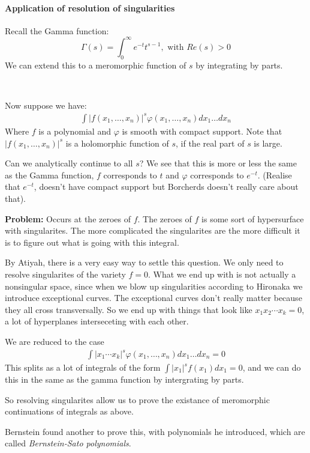 \paragraph*{Application of resolution of singularities}
Recall the Gamma function:\[\Gamma(s) = \int_0^\infty e^{-t}t^{s-1}, \text{ with }Re(s)>0\]
We can extend this to a meromorphic function of $s$ by integrating by parts.

\

Now suppose we have:\begin{align*}
    \int |f(x_1,\ldots,x_n)|^s\varphi(x_1,\ldots,x_n)dx_1\ldots dx_n
\end{align*} 
Where $f$ is a polynomial and $\varphi$ is smooth with compact support. Note that $|f(x_1,\ldots,x_n)|^s$ is a holomorphic function of $s$, if the real part of $s$ is large.

Can we analytically continue to all $s$? We see that this is more or less the same as the Gamma function, $f$ corresponds to $t$ and $\varphi$ corresponds to $e^{-t}$. (Realise that $e^{-t}$, doesn't have compact support but Borcherds doesn't really care about that).

\textbf{Problem:} Occurs at the zeroes of $f$. The zeroes of $f$ is some sort of hypersurface with singularites. The more complicated the singularites are the more difficult it is to figure out what is going with this integral.

By Atiyah, there is a very easy way to settle this question. We only need to resolve singularites of the variety $f=0$. What we end up with is not actually a nonsingular space, since when we blow up singularities according to Hironaka we introduce exceptional curves. The exceptional curves don't really matter because they all cross transversally. 
So we end up with things that look like $x_1x_2\cdots x_k =0$, a lot of hyperplanes interseceting with each other.

We are reduced to the case\begin{align*}
    \int |x_1\cdots x_k|^s\varphi(x_1,\ldots,x_n)dx_1\ldots dx_n = 0
\end{align*}  
This splits as a lot of integrals of the form $\int |x_1|^s f(x_1)dx_1=0$, and we can do this in the same as the gamma function by intergrating by parts.

So resolving singularites allow us to prove the existance of meromorphic continuations of integrals as above.

Bernstein found another to prove this, with polynomials he introduced, which are called \textit{Bernstein-Sato polynomials}.

